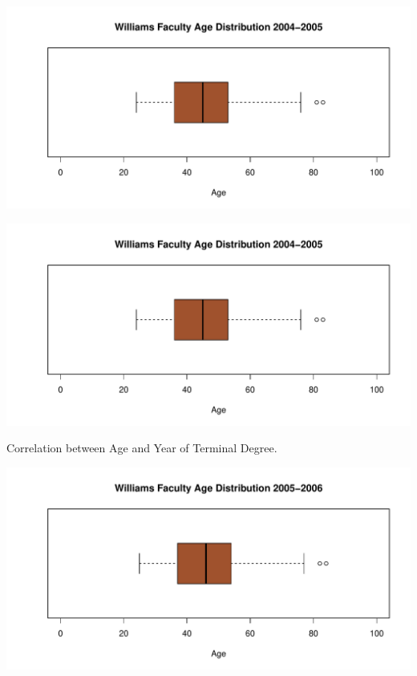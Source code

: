 \documentclass[12pt,a4paper]{article}\usepackage[]{graphicx}\usepackage[]{color}
\makeatletter
\def\maxwidth{ %
  \ifdim\Gin@nat@width>\linewidth
    \linewidth
  \else
    \Gin@nat@width
  \fi
}
\newenvironment{knitrout}{}{} %
\theoremstyle{definition}
\makeatother
\begin{document}
\begin{knitrout}
\color{fgcolor}
\includegraphics[width=\maxwidth]{figure/unnamed-chunk-14-1} 

\end{knitrout}

\begin{knitrout}
\color{fgcolor}
\includegraphics[width=\maxwidth]{figure/unnamed-chunk-15-1} 

\end{knitrout}

Correlation between Age and Year of Terminal Degree.

\begin{knitrout}
\color{fgcolor}
\includegraphics[width=\maxwidth]{figure/unnamed-chunk-16-1} 

\end{knitrout}
\end{document}
